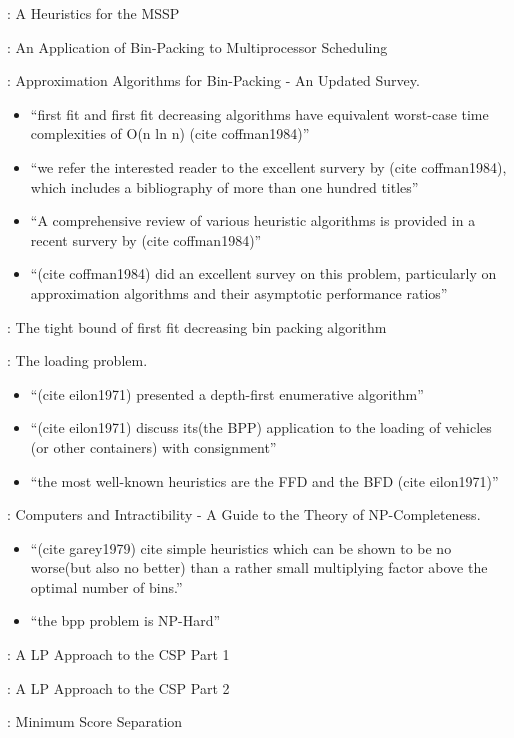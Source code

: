 \documentclass[oribibl]{llncs}
\begin{document}
\cite{becker2015}: A Heuristics for the MSSP

\cite{coffman1978}: An Application of Bin-Packing to Multiprocessor Scheduling

\cite{coffman1984}: Approximation Algorithms for Bin-Packing - An Updated Survey.
\begin{itemize}
	\item ``first fit and first fit decreasing algorithms have equivalent worst-case time complexities of O(n ln n) (cite coffman1984)''
	\item ``we refer the interested reader to the excellent survery by (cite coffman1984), which includes a bibliography of more than one hundred titles''
	\item ``A comprehensive review of various heuristic algorithms is provided in a recent survery by (cite coffman1984)''
	\item ``(cite coffman1984) did an excellent survey on this problem, particularly on approximation algorithms and their asymptotic performance ratios''
\end{itemize}
\cite{dosa2007}: The tight bound of first fit decreasing bin packing algorithm

\cite{eilon1971}: The loading problem. 
\begin{itemize}
	\item ``(cite eilon1971) presented a depth-first enumerative algorithm''
	\item ``(cite eilon1971) discuss its(the BPP) application to the loading of vehicles (or other containers) with consignment'' 
	\item ``the most well-known heuristics are the FFD and the BFD (cite eilon1971)''
\end{itemize}
\cite{garey1979}: Computers and Intractibility - A Guide to the Theory of NP-Completeness. 
\begin{itemize}
	\item ``(cite garey1979) cite simple heuristics which can be shown to be no
	worse(but also no better) than a rather small multiplying factor above the optimal number of bins.''
	\item ``the bpp problem is NP-Hard''
\end{itemize}

\cite{gilmore1961}: A LP Approach to the CSP Part 1

\cite{gilmore1963}: A LP Approach to the CSP Part 2

\cite{goulimis2004}: Minimum Score Separation
\end{document}
